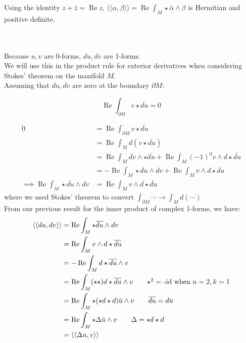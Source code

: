 \documentclass{article}
\def\lap{\Delta}
\DeclareMathOperator{\re}{Re}
\begin{document}
Using the identity $z + \bar{z} = \re z$, $\langle \langle \alpha, \beta \rangle \rangle = \re \int_M \star \bar{\alpha} \wedge \beta$
is Hermitian and positive definite.


\vspace{1.8cm}
\\\\


Because $u,v$ are 0-forms, $du,dv$ are 1-forms.\\
We will use this in the product rule for exterior derivatives when considering Stokes' theorem on the manifold $M$.\\
Assuming that $du,dv$ are zero at the boundary $\partial M$:

$$
    \re \int_{\partial M} v \star \overline{du} = 0
$$

\begin{align*}
    0 &=\re \int_{\partial M} v \star \overline{du} \\
        &= \re \int_M d(v \star \overline{du}) \\
        &= \re \int_M dv \wedge \star \overline{du} + \re \int_M (-1)^0 v \wedge d \star \overline{du} \\
        &= -\re \int_M \star \overline{du} \wedge dv + \re \int_M v \wedge d \star \overline{du} \\
    \implies \re \int_M \star \overline{du} \wedge dv &= \re \int_M v \wedge d \star \overline{du}
\end{align*}
where we used Stokes' theorem to convert $\int_{\partial M} \cdots \rightarrow \int_M d(\cdots)$\\

From our previous result for the inner product of complex 1-forms, we have:
\begin{align*}
    \langle \langle du, dv \rangle \rangle &= \re \int_M \star \overline{du} \wedge dv  \\
        &= \re \int_M v \wedge d \star \overline{du} \\
        &= -\re \int_M d \star \overline{du} \wedge v \\
        &= \re \int_M (\star \star) d \star \overline{du} \wedge v \tag*{$\star^2 = $ -id when $n=2, k=1$} \\
        &= \re \int_M \star (\star d \star d) \bar{u} \wedge v \tag*{$\overline{du} = d\bar{u}$} \\
        &= \re \int_M \star \lap\bar{u} \wedge v \tag*{$\lap = \star d \star d$} \\
        &= \langle \langle \lap u, v \rangle \rangle
\end{align*}
\end{document}
